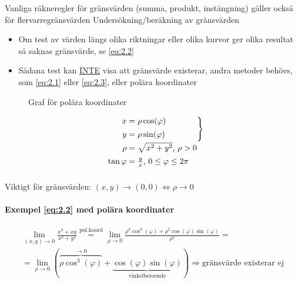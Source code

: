 \documentclass{article}
\let\oldsqrt\sqrt
\renewcommand*{\sqrt}[2][\ ]{\oldsqrt[#1]{#2} }
\begin{document}
Vanliga räkneregler för gränsvärden (summa, produkt, instängning) gäller också för flervarregränsvärden
Undersökning/beräkning av gränsvärden

\begin{itemize}
\item Om test av värden längs olika riktningar eller olika kurvor ger olika resultat så saknas gränsvärde, se \eqref{eq:2.2}
\item Sådana test kan \underline{INTE} visa att gränsvärde existerar, andra metoder behövs, som \eqref{eq:2.1} eller \eqref{eq:2.3}, eller polära koordinater
\end{itemize}

\begin{figure}[ht] 
  \caption{Graf för polära koordinater} \label{fig:2.2}
\end{figure}

\[
	\def\arraystretch{1.1}
	\begin{blockarray}{r@{\;}l}
	\begin{block}{r@{\;}l\}}
		x & = \rho \cos(\varphi) \\[\jot]
		y & = \rho \sin(\varphi) \\[\jot]
	\end{block}
	\rho  & = \sqrt{x^2+y^2} \text{, } \rho > 0 \\ [\jot]
	\tan{\varphi} & = \frac{y}{x} \text{, } 0 \leq \varphi \leq 2\pi
	\end{blockarray}
\]
Viktigt för gränsvärden: \( (x,y) \rightarrow (0,0) \iff \rho \rightarrow 0 \)

\newpage

\paragraph{Exempel \eqref{eq:2.2} med polära koordinater}

\[
\begin{split}
\lim_{(x,y) \rightarrow 0} \frac{x^3+xy}{x^2+y^2} \overset{\mathrm{pol.koord}}{=} \lim_{\rho \rightarrow 0} \frac{\rho^3 \cos^3(\varphi) + \rho^2 \cos(\varphi) \sin(\varphi)}{\rho^2} = \\
=\lim_{\rho \rightarrow 0} (\overbrace{\rho \cos^3(\varphi)}^{\rightarrow 0}+\underbrace{\cos(\varphi) \sin(\varphi)}_\text{vinkelberoende}) \Rightarrow \text{gränsvärde existerar ej}
\end{split}
\]
\end{document}
